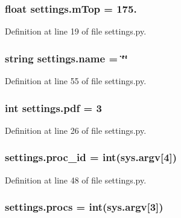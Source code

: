 \subsubsection[{\texorpdfstring{m\+Top}{mTop}}]{\setlength{\rightskip}{0pt plus 5cm}float settings.\+m\+Top = 175.}\hypertarget{namespacesettings_a9c21d19d19519afd9c32d6c6c8cd7be5}{}\label{namespacesettings_a9c21d19d19519afd9c32d6c6c8cd7be5}


Definition at line 19 of file settings.\+py.

\subsubsection[{\texorpdfstring{name}{name}}]{\setlength{\rightskip}{0pt plus 5cm}string settings.\+name = \char`\"{}\char`\"{}}\hypertarget{namespacesettings_a503a5b5d5affd77fa0d769a08bc95a13}{}\label{namespacesettings_a503a5b5d5affd77fa0d769a08bc95a13}


Definition at line 55 of file settings.\+py.

\subsubsection[{\texorpdfstring{pdf}{pdf}}]{\setlength{\rightskip}{0pt plus 5cm}int settings.\+pdf = 3}\hypertarget{namespacesettings_acf9ea9fa8fde8d823a80f50e2059d636}{}\label{namespacesettings_acf9ea9fa8fde8d823a80f50e2059d636}


Definition at line 26 of file settings.\+py.

\subsubsection[{\texorpdfstring{proc\+\_\+id}{proc_id}}]{\setlength{\rightskip}{0pt plus 5cm}settings.\+proc\+\_\+id = int(sys.\+argv\mbox{[}4\mbox{]})}\hypertarget{namespacesettings_a3f99a62963c1c5a80e211f1507f4c8b0}{}\label{namespacesettings_a3f99a62963c1c5a80e211f1507f4c8b0}


Definition at line 48 of file settings.\+py.

\subsubsection[{\texorpdfstring{procs}{procs}}]{\setlength{\rightskip}{0pt plus 5cm}settings.\+procs = int(sys.\+argv\mbox{[}3\mbox{]})}\hypertarget{namespacesettings_ae0c0aa2289384505ec166c1b20c0f98c}{}\label{namespacesettings_ae0c0aa2289384505ec166c1b20c0f98c}


